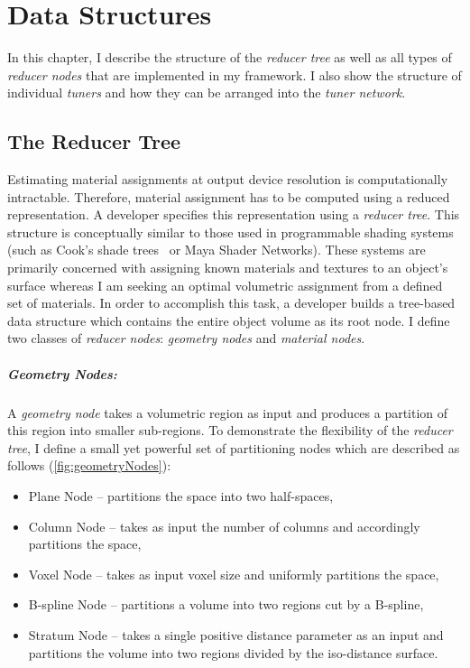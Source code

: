 \chapter{Data Structures}
\label{chap:struct}
In this chapter, I describe the structure of the \emph{reducer tree} as well as all types of \emph{reducer nodes} that 
are implemented in my framework.
I also show the structure of individual \emph{tuners} and how they can be arranged into the \emph{tuner network}.

\section{The Reducer Tree}
Estimating material assignments at output device resolution is computationally intractable.
Therefore, material assignment has to be computed using a reduced representation.
A developer specifies this representation using a \emph{reducer tree}.
This structure is conceptually similar to those used in programmable shading systems
(such as Cook's shade trees~ or Maya Shader Networks).
These systems are primarily concerned with assigning known materials and textures to an object's surface
whereas I am seeking an optimal volumetric assignment from a defined set of materials. 
In order to accomplish this task, a developer builds a tree-based data structure
which contains the entire object volume as its root node.
I define two classes of \emph{reducer nodes}: \emph{geometry nodes} and \emph{material nodes}.

\paragraph{Geometry Nodes:}A \emph{geometry node} takes a volumetric region as input and produces
a partition of this region into smaller sub-regions. 
To demonstrate the flexibility of the \emph{reducer tree}, I define a small yet powerful set of partitioning nodes which are described as follows 
 (\autoref{fig:geometryNodes}):\vspace{-0.25\baselineskip}
\begin{itemize}
\item Plane Node --  partitions the space into two half-spaces, \vspace{-0.25\baselineskip}
\item Column Node -- takes as input the number of columns and accordingly partitions the space,\vspace{-0.25\baselineskip}
\item Voxel Node -- takes as input voxel size and uniformly partitions the space,\vspace{-0.25\baselineskip}
\item B-spline Node -- partitions a volume into two regions cut by a B-spline,\vspace{-0.25\baselineskip}
\item Stratum Node -- takes a single positive distance parameter as an input and partitions the volume into two regions divided by the iso-distance surface.\vspace{-0.25\baselineskip}
\end{itemize} 

